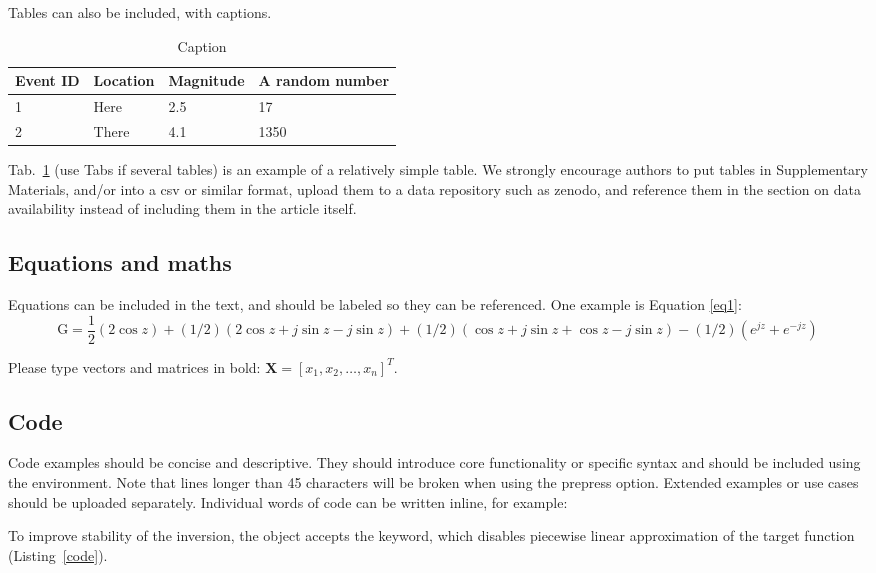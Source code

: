 \documentclass{article}
\begin{document}
	
	Tables can also be included, with captions.
		\begin{table}[ht!]
			\begin{tabular}{llll}
				Event ID    & Location & Magnitude & A random number \\
				\hline
				1 & Here & 2.5 & 17 \\
				2 & There & 4.1 & 1350 \\
			\end{tabular}
			\caption{Caption}
			\label{tab:1}
		\end{table}
		
		Tab.~\ref{tab:1} (use Tabs if several tables) is an example of a relatively simple table. We strongly encourage authors to put tables in Supplementary Materials, and/or into a csv or similar format, upload them to a data repository such as zenodo, and reference them in the section on data availability instead of including them in the article itself. 
		
		\subsection{Equations and maths}
		Equations can be included in the text, and should be labeled so they can be referenced. One example is Equation \ref{eq1}:
		\begin{equation} \label{eq1}
			\mathrm{G} = \frac{1}{2}(2\cos z) + (1/2)(2\cos z+j\sin z-j\sin z) + (1/2)(\cos z+j\sin z+\cos z-j\sin z) -  (1/2)(e^{jz}+e^{-jz})  
		\end{equation}
		
		Please type vectors and matrices in bold: $\mathbf{X} = \left[x_1,x_2,\ldots,x_n \right]^T$.
		
		\subsection{Code}
		
		Code examples should be concise and descriptive. They should introduce core functionality or specific syntax and should be included using the  environment. Note that lines longer than 45 characters will be broken when using the prepress option. Extended examples or use cases should be uploaded separately. Individual words of code can be written inline, for example:
		
		To improve stability of the inversion, the  object accepts the  keyword, which disables piecewise linear approximation of the target function (Listing~\ref{code}).
		
\end{document}
